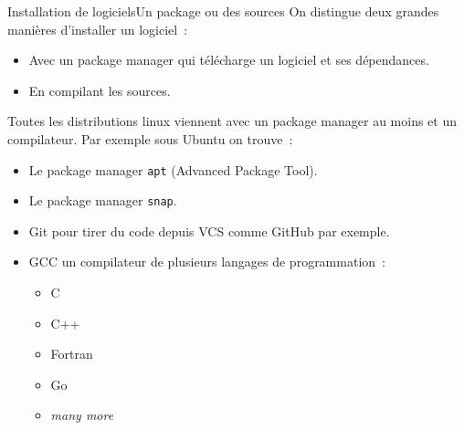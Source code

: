 \documentclass{beamer}
\begin{document}
    \begin{frame}{Installation de logiciels}{Un package ou des sources}
        On distingue deux grandes manières d'installer un logiciel~:
        \begin{itemize}
            \item Avec un package manager qui télécharge un logiciel et ses dépendances.
            \item En compilant les sources.
        \end{itemize}
        \bigbreak
        Toutes les distributions linux viennent avec un package manager au moins et un compilateur.
        Par exemple sous Ubuntu on trouve~:
        \begin{itemize}
            \item Le package manager \lstinline{apt} (Advanced Package Tool).
            \item Le package manager \lstinline{snap}.
            \item Git pour tirer du code depuis VCS comme GitHub par exemple.
            \item GCC un compilateur de plusieurs langages de programmation~:
            \begin{itemize}
                \item C
                \item C++
                \item Fortran
                \item Go
                \item \textit{many more}
            \end{itemize}
        \end{itemize}
    \end{frame}
\end{document}
